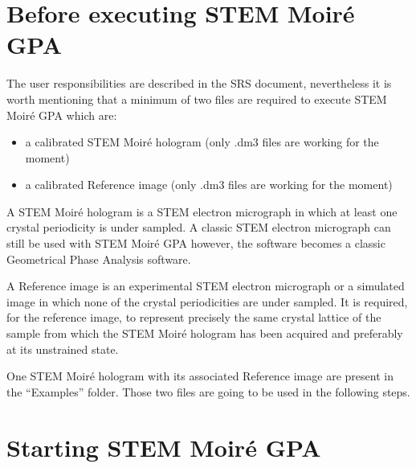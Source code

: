 \documentclass[12pt, titlepage]{article}
\newcommand{\progname}{STEM Moir{\'e} GPA}
\begin{document}
\section{Before executing \progname{}}

The user responsibilities are described in the SRS document, nevertheless it is worth mentioning that a minimum of two files are required to execute \progname{} which are:
\begin{itemize}
\item a calibrated STEM Moir{\'e} hologram (only .dm3 files are working for the moment)
\item a calibrated Reference image (only .dm3 files are working for the moment)
\end{itemize}

A STEM Moir{\'e} hologram is a STEM electron micrograph in which at least one crystal periodicity is under sampled. A classic STEM electron micrograph can still be used with \progname{} however, the software becomes a classic Geometrical Phase Analysis software.\medskip

A Reference image is an experimental STEM electron micrograph or a simulated image in which none of the crystal periodicities are under sampled. It is required, for the reference image, to represent precisely the same crystal lattice of the sample from which the STEM Moir{\'e} hologram has been acquired and preferably at its unstrained state.\medskip

One STEM Moir{\'e} hologram with its associated Reference image are present in the \enquote{Examples} folder. Those two files are going to be used in the following steps.

\section{Starting \progname{}}
\end{document}
